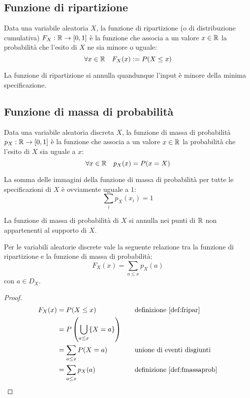 \subsection{Funzione di ripartizione}
\begin{defin} \label{def:fripar}
	Data una variabile aleatoria $X$, la funzione di ripartizione (o di distribuzione cumulativa) $F_X:\mathbb R\to[0,1]$ è la funzione che associa a un valore $x\in\mathbb R$ la probabilità che l'esito di $X$ ne sia minore o uguale:
	\begin{equation*}
		\forall x\in\mathbb R\quad F_X(x):=P(X\leq x)
	\end{equation*}
\end{defin}

La funzione di ripartizione si annulla quandunque l'input è minore della minima specificazione.




\subsection{Funzione di massa di probabilità}
\begin{defin} \label{def:fmassaprob}
	Data una variabile aleatoria discreta $X$, la funzione di massa di probabilità $p_X:\mathbb R\to[0,1]$ è la funzione che associa a un valore $x\in\mathbb R$ la probabilità che l'esito di $X$ sia uguale a $x$:
	\begin{equation*}
		\forall x \in\mathbb R\quad p_X(x)= P(x=X)
	\end{equation*}
\end{defin}

La somma delle immagini della funzione di massa di probabilità per tutte le specificazioni di $X$ è ovviamente uguale a $1$:
\begin{equation} \label{eq:sommamassa}
	\sum_i p_X (x_i) = 1
\end{equation}

La funzione di massa di probabilità di $X$ si annulla nei punti di $\mathbb R$ non appartenenti al supporto di $X$.

\begin{prop}
	Per le variabili aleatorie discrete vale la seguente relazione tra la funzione di ripartizione e la funzione di massa di probabilità:
	\begin{equation*}
		F_X(x)=\sum_{a\leq x} p_X(a)
	\end{equation*}
	con $a\in D_X$.
\end{prop}
\begin{proof}
	\begin{align*}
		F_X(x) & = P(X\leq x)                             & \quad & \text{definizione \ref{def:fripar}}     \\
		       & = P\left(\bigcup_{a\leq x}\{X=a\}\right)                                       \\
		       & = \sum_{a\leq x} P(X=a)                  & \quad & \text{unione di eventi disgiunti}       \\
		       & = \sum_{a\leq x} p_X(a)                  & \quad & \text{definizione \ref{def:fmassaprob}}
	\end{align*}
\end{proof}



